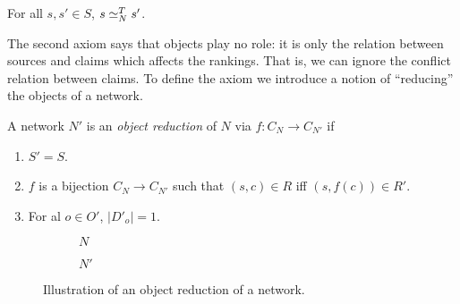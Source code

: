 \begin{axiom}[\flatsources{}]
    For all $s, s' \in S$, $s \simeq_N^T s'$.
\end{axiom}

The second axiom says that objects play no role: it is only the relation
between sources and claims which affects the rankings. That is, we can ignore
the conflict relation between claims. To define the axiom we introduce a notion
of ``reducing'' the objects of a network.

\begin{definition}
    A network $N'$ is an \emph{object reduction} of $N$ via $f: C_N \to C_{N'}$
    if
    \begin{enumerate}
        \item $S' = S$.
        \item $f$ is a bijection $C_N \to C_{N'}$ such that $(s, c) \in R$
              iff $(s, f(c)) \in R'$.
        \item For al $o \in O'$, $|D'_o| = 1$.
    \end{enumerate}
\end{definition}

\begin{figure}
    \centering
        \begin{subfigure}{.4\textwidth}
            \centering
            \caption{$N$}
        \end{subfigure}
        \begin{subfigure}{.4\textwidth}
            \centering
            \caption{$N'$}
        \end{subfigure}
    \caption{
        Illustration of an object reduction of a network.
    }
    \label{td_new_fig_object_reduction}
\end{figure}

